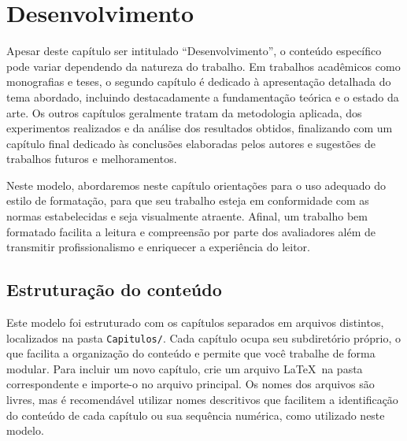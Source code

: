 \chapter{Desenvolvimento}\label{cap:desenvolvimento}

Apesar deste capítulo ser intitulado ``Desenvolvimento'', o conteúdo específico pode variar dependendo
da natureza do trabalho. Em trabalhos acadêmicos como monografias e teses, o segundo capítulo é
dedicado à apresentação detalhada do tema abordado, incluindo destacadamente a fundamentação
teórica e o estado da arte. Os outros capítulos geralmente tratam da metodologia aplicada, dos
experimentos realizados e da análise dos resultados obtidos, finalizando com um capítulo final
dedicado às conclusões elaboradas pelos autores e sugestões de trabalhos futuros e melhoramentos.

Neste modelo, abordaremos neste capítulo orientações para o uso adequado do estilo de formatação,
para que seu trabalho esteja em conformidade com as normas estabelecidas e seja visualmente
atraente. Afinal, um trabalho bem formatado facilita a leitura e compreensão por parte dos
avaliadores além de transmitir profissionalismo e enriquecer a experiência do leitor.

\section{Estruturação do conteúdo}\label{sec:estrutura-desenvolvimento}

Este modelo  foi estruturado com os capítulos separados em arquivos distintos, localizados na
pasta \texttt{Capitulos/}. Cada capítulo ocupa seu subdiretório próprio, o que facilita a
organização do conteúdo e permite que você trabalhe de forma modular. Para
incluir um novo capítulo, crie um arquivo \LaTeX\ na pasta correspondente e importe-o no arquivo
principal. Os nomes dos arquivos são livres, mas é recomendável utilizar nomes descritivos que
facilitem a identificação do conteúdo de cada capítulo ou sua sequência numérica, como utilizado
neste modelo.

